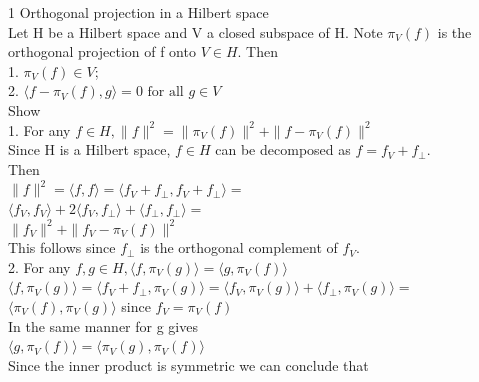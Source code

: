 \documentclass[18pt]{article}
\author{Adam Handwerger}
\begin{document}
\begin{flushleft}
1 Orthogonal projection in a Hilbert space\\

\vspace{.4cm}
Let H be a Hilbert space and V a closed subspace of H. Note $\pi_V(f)$ is the orthogonal projection of f onto $V \in H$. Then \\
\vspace{.4cm}
1. $\pi_V(f) \in V$;\\
2. $\langle f-\pi_V(f),g\rangle=0 \text{ for all } g \in V$\\
\vspace{.4cm}
Show\\
\vspace{.4cm}
1. For any $f \in H, \parallel f \parallel^2=\parallel \pi_V(f) \parallel^2+\parallel f-\pi_V(f) \parallel^2$\\
\vspace{.4cm}
Since H is a Hilbert space, $f \in H$ can be decomposed as $f=f_V+f_{\perp}$.\\
Then\\
\vspace{.4cm}
$\parallel f \parallel^2=\langle f,f \rangle=\langle f_V+f_{\perp},f_V+f_{\perp} \rangle=$\\
$\langle f_V,f_V \rangle+2\langle f_V,f_{\perp} \rangle+\langle f_{\perp},f_{\perp} \rangle=$\\
$\parallel f_V \parallel^2+\parallel f_V-\pi_V(f) \parallel^2$\\
\vspace{.4cm}
This follows since $f_{\perp}$ is the orthogonal complement of $f_V$.\\
\vspace{.4cm}
2. For any $f,g \in H, \langle f,\pi_V(g)\rangle=\langle g,\pi_V(f)\rangle$\\
\vspace{.4cm}
$\langle f,\pi_V(g) \rangle=\langle f_V+f_{\perp},\pi_V(g) \rangle=\langle f_V,\pi_V(g) \rangle+\langle f_{\perp},\pi_V(g) \rangle=$\\
$\langle \pi_V(f),\pi_V(g) \rangle$ since $f_V =\pi_V(f)$\\
\vspace{.4cm}
In the same manner for g gives\\
\vspace{.4cm}
$\langle g,\pi_V(f) \rangle=\langle \pi_V(g),\pi_V(f) \rangle$\\
\vspace{.4cm}
Since the inner product is symmetric we can conclude that\\

\end{flushleft}
\end{document}

